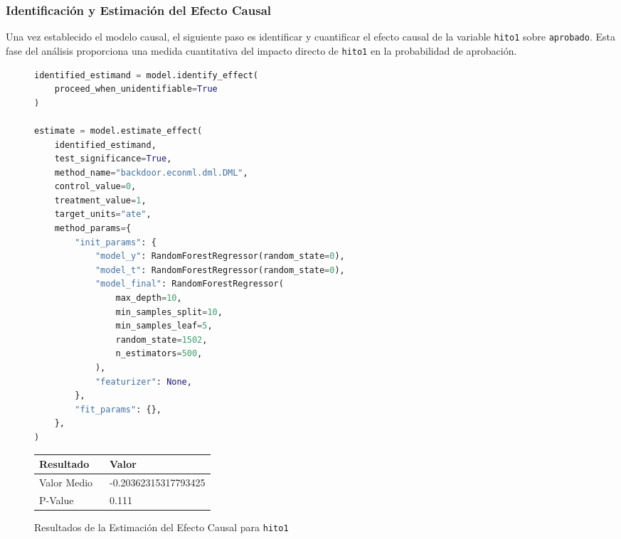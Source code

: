 \subsubsection{Identificación y Estimación del Efecto Causal}

Una vez establecido el modelo causal, el siguiente paso es identificar y cuantificar el efecto causal de la variable \texttt{hito1} sobre \texttt{aprobado}. Esta fase del análisis proporciona una medida cuantitativa del impacto directo de \texttt{hito1} en la probabilidad de aprobación.

\begin{figure}[H]
    \centering
    \begin{minipage}{0.5\textwidth}
        \begin{lstlisting}[language=Python, caption=Proceso de Identificación y Estimación del Efecto Causal, label=lst:IdentificarEstimarefectoCausalHito1]
identified_estimand = model.identify_effect(
    proceed_when_unidentifiable=True
)

estimate = model.estimate_effect(
    identified_estimand,
    test_significance=True,
    method_name="backdoor.econml.dml.DML",
    control_value=0,
    treatment_value=1,
    target_units="ate",
    method_params={
        "init_params": {
            "model_y": RandomForestRegressor(random_state=0),
            "model_t": RandomForestRegressor(random_state=0),
            "model_final": RandomForestRegressor(
                max_depth=10,
                min_samples_split=10,
                min_samples_leaf=5,
                random_state=1502,
                n_estimators=500,
            ),
            "featurizer": None,
        },
        "fit_params": {},
    },
)
\end{lstlisting}
    \end{minipage}
    \hfill
    \begin{minipage}{0.45\textwidth}
        \centering        
        \begin{tabular}{lp{0.6\linewidth}}
            \toprule
            \textbf{Resultado} & \textbf{Valor} \\
            \midrule
            Valor Medio & -0.20362315317793425 \\
            P-Value & 0.111 \\
            \bottomrule
        \end{tabular}
        \caption{Resultados de la Estimación del Efecto Causal para \texttt{hito1}}
        \label{tab:efecto_causal_hito1}
    \end{minipage}
\end{figure}

